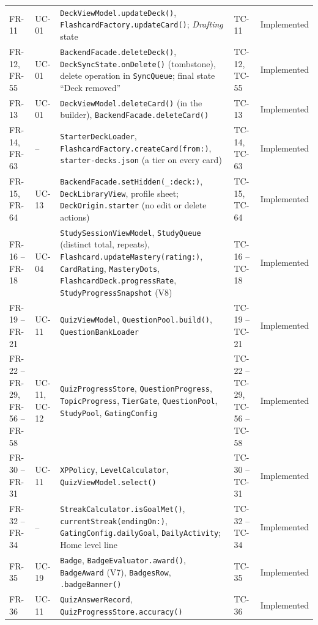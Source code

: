 \documentclass[12pt,letterpaper]{article}
\begin{document}
\begin{xltabular}{\textwidth}{@{}l L{1.6cm} Y L{2.0cm} L{1.9cm}@{}}
FR-11 & UC-01 & \texttt{DeckViewModel.updateDeck()}, \texttt{FlashcardFactory.updateCard()}; \emph{Drafting} state & TC-11 & Implemented \\
FR-12, FR-55 & UC-01 & \texttt{BackendFacade.deleteDeck()}, \texttt{DeckSyncState.onDelete()} (tombstone), delete operation in \texttt{SyncQueue}; final state ``Deck removed'' & TC-12, TC-55 & Implemented \\
FR-13 & UC-01 & \texttt{DeckViewModel.deleteCard()} (in the builder), \texttt{BackendFacade.deleteCard()} & TC-13 & Implemented \\
FR-14, FR-63 & -- & \texttt{StarterDeckLoader}, \texttt{FlashcardFactory.createCard(from:)}, \texttt{starter-decks.json} (a tier on every card) & TC-14, TC-63 & Implemented \\
FR-15, FR-64 & UC-13 & \texttt{BackendFacade.setHidden(\_:deck:)}, \texttt{DeckLibraryView}, profile sheet; \texttt{DeckOrigin.starter} (no edit or delete actions) & TC-15, TC-64 & Implemented \\
FR-16 -- FR-18 & UC-04 & \texttt{StudySessionViewModel}, \texttt{StudyQueue} (distinct total, repeats), \texttt{Flashcard.updateMastery(rating:)}, \texttt{CardRating}, \texttt{MasteryDots}, \texttt{FlashcardDeck.progressRate}, \texttt{StudyProgressSnapshot} (V8) & TC-16 -- TC-18 & Implemented \\
FR-19 -- FR-21 & UC-11 & \texttt{QuizViewModel}, \texttt{QuestionPool.build()}, \texttt{QuestionBankLoader} & TC-19 -- TC-21 & Implemented \\
FR-22 -- FR-29, FR-56 -- FR-58 & UC-11, UC-12 & \texttt{QuizProgressStore}, \texttt{QuestionProgress}, \texttt{TopicProgress}, \texttt{TierGate}, \texttt{QuestionPool}, \texttt{StudyPool}, \texttt{GatingConfig} & TC-22 -- TC-29, TC-56 -- TC-58 & Implemented \\
FR-30 -- FR-31 & UC-11 & \texttt{XPPolicy}, \texttt{LevelCalculator}, \texttt{QuizViewModel.select()} & TC-30 -- TC-31 & Implemented \\
FR-32 -- FR-34 & -- & \texttt{StreakCalculator.isGoalMet()}, \texttt{currentStreak(endingOn:)}, \texttt{GatingConfig.dailyGoal}, \texttt{DailyActivity}; Home level line & TC-32 -- TC-34 & Implemented \\
FR-35 & UC-19 & \texttt{Badge}, \texttt{BadgeEvaluator.award()}, \texttt{BadgeAward} (V7), \texttt{BadgesRow}, \texttt{.badgeBanner()} & TC-35 & Implemented \\
FR-36 & UC-11 & \texttt{QuizAnswerRecord}, \texttt{QuizProgressStore.accuracy()} & TC-36 & Implemented \\

\end{xltabular}
\end{document}
